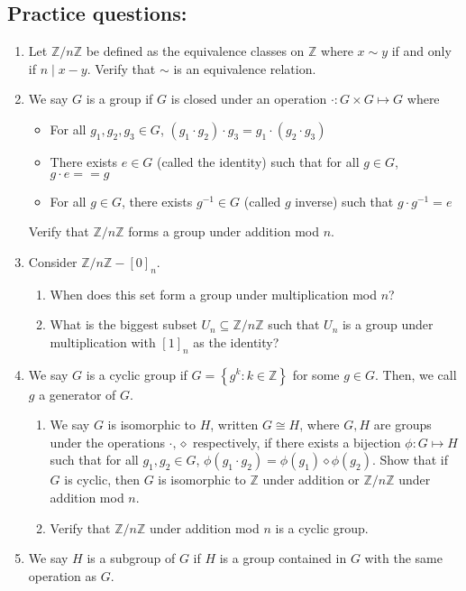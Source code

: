 \documentclass[letterpaper,12pt]{article}
\newcommand{\set}[1]{\left\{ #1 \right\}}
\begin{document}
\subsection*{Practice questions:}
\begin{enumerate}
\item Let $\mathbb{Z}/n\mathbb{Z}$ be defined as the equivalence classes on $\mathbb{Z}$ where $x \sim y$ if and only if $n \mid x-y$. Verify that $\sim$ is an equivalence relation.
\item We say $G$ is a group if $G$ is closed under an operation $\cdot : G \times G \mapsto G$ where \begin{itemize}
    \item For all $g_1,g_2,g_3 \in G$, $(g_1\cdot g_2)\cdot g_3 = g_1\cdot(g_2 \cdot g_3)$
    \item There exists $e \in G$ (called the identity) such that for all $g \in G$, $g \cdot e = = g$
    \item For all $g \in G$, there exists $g^{-1} \in G$ (called $g$ inverse) such that $g \cdot g^{-1} =  e$
\end{itemize}
Verify that $\mathbb{Z}/n\mathbb{Z}$ forms a group under addition mod $n$.
\item Consider $\mathbb{Z}/n\mathbb{Z} - [0]_n$. \begin{enumerate}
    \item When does this set form a group under multiplication mod $n$?
    \item What is the biggest subset $U_n \subseteq \mathbb{Z}/n\mathbb{Z}$ such that $U_n$ is a group under multiplication with $[1]_n$ as the identity?
\end{enumerate} 
\item We say $G$ is a cyclic group if $G = \set{g^k : k \in \mathbb{Z}}$ for some $g \in G$. Then, we call $g$ a generator of $G$. \begin{enumerate}
    \item We say $G$ is isomorphic to $H$, written $G\cong H$, where $G,H$ are groups under the operations $\cdot,\diamond$ respectively, if there exists a bijection $\phi: G \mapsto H$ such that for all $g_1,g_2 \in G$, $\phi(g_1\cdot g_2) = \phi(g_1)\diamond \phi(g_2)$. Show that if $G$ is cyclic, then $G$ is isomorphic to $\mathbb{Z}$ under addition or $\mathbb{Z}/n\mathbb{Z}$ under addition mod $n$.
    \item Verify that $\mathbb{Z}/n\mathbb{Z}$ under addition mod $n$ is a cyclic group.
\end{enumerate}
\item We say $H$ is a subgroup of $G$ if $H$ is a group contained in $G$ with the same operation as $G$. \begin{enumerate}

\end{enumerate}
\end{enumerate}
\end{document}
